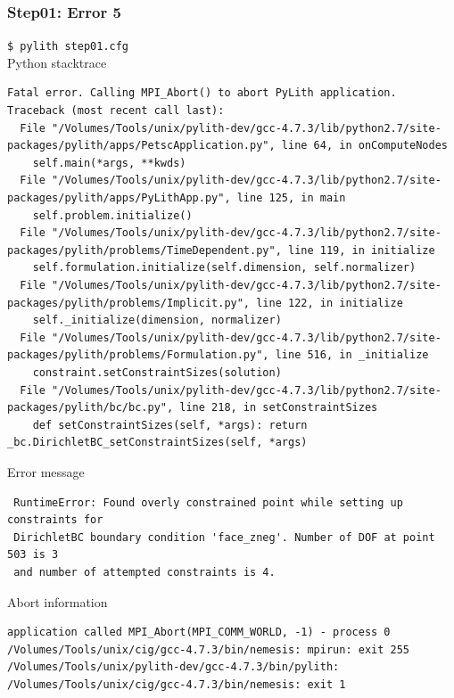 \documentclass{beamer}
\newcommand{\cmd}[1]{{\tiny\tt \color{ltred}#1}}
\newcommand{\errlabel}[1]{{\small \color{blue}#1}}
\begin{document}
\begin{frame}[fragile]
  \frametitle{Step01: Error 5}

\cmd{\$ pylith step01.cfg}\\
\errlabel{Python stacktrace}
\begin{lstlisting}
Fatal error. Calling MPI_Abort() to abort PyLith application.
Traceback (most recent call last):
  File "/Volumes/Tools/unix/pylith-dev/gcc-4.7.3/lib/python2.7/site-packages/pylith/apps/PetscApplication.py", line 64, in onComputeNodes
    self.main(*args, **kwds)
  File "/Volumes/Tools/unix/pylith-dev/gcc-4.7.3/lib/python2.7/site-packages/pylith/apps/PyLithApp.py", line 125, in main
    self.problem.initialize()
  File "/Volumes/Tools/unix/pylith-dev/gcc-4.7.3/lib/python2.7/site-packages/pylith/problems/TimeDependent.py", line 119, in initialize
    self.formulation.initialize(self.dimension, self.normalizer)
  File "/Volumes/Tools/unix/pylith-dev/gcc-4.7.3/lib/python2.7/site-packages/pylith/problems/Implicit.py", line 122, in initialize
    self._initialize(dimension, normalizer)
  File "/Volumes/Tools/unix/pylith-dev/gcc-4.7.3/lib/python2.7/site-packages/pylith/problems/Formulation.py", line 516, in _initialize
    constraint.setConstraintSizes(solution)
  File "/Volumes/Tools/unix/pylith-dev/gcc-4.7.3/lib/python2.7/site-packages/pylith/bc/bc.py", line 218, in setConstraintSizes
    def setConstraintSizes(self, *args): return _bc.DirichletBC_setConstraintSizes(self, *args)
\end{lstlisting}
\errlabel{Error message}
\begin{lstlisting}
 RuntimeError: Found overly constrained point while setting up constraints for
 DirichletBC boundary condition 'face_zneg'. Number of DOF at point 503 is 3
 and number of attempted constraints is 4.
\end{lstlisting}
\errlabel{Abort information}
\begin{lstlisting}
application called MPI_Abort(MPI_COMM_WORLD, -1) - process 0
/Volumes/Tools/unix/cig/gcc-4.7.3/bin/nemesis: mpirun: exit 255
/Volumes/Tools/unix/pylith-dev/gcc-4.7.3/bin/pylith: /Volumes/Tools/unix/cig/gcc-4.7.3/bin/nemesis: exit 1
\end{lstlisting}
  
\end{frame}
\end{document}
